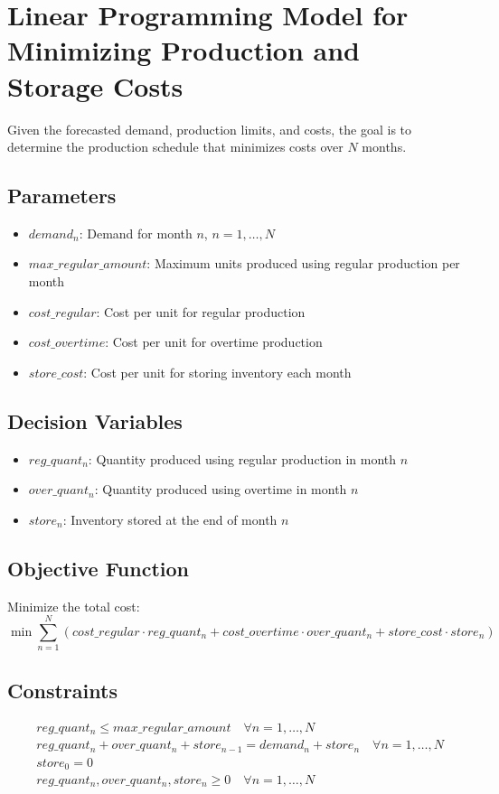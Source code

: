 \documentclass{article}
\begin{document}
\section*{Linear Programming Model for Minimizing Production and Storage Costs}

Given the forecasted demand, production limits, and costs, the goal is to determine the production schedule that minimizes costs over \(N\) months.

\subsection*{Parameters}
\begin{itemize}
    \item \(demand_n\): Demand for month \(n\), \(n = 1, \ldots, N\)
    \item \(max\_regular\_amount\): Maximum units produced using regular production per month
    \item \(cost\_regular\): Cost per unit for regular production
    \item \(cost\_overtime\): Cost per unit for overtime production
    \item \(store\_cost\): Cost per unit for storing inventory each month
\end{itemize}

\subsection*{Decision Variables}
\begin{itemize}
    \item \(reg\_quant_n\): Quantity produced using regular production in month \(n\)
    \item \(over\_quant_n\): Quantity produced using overtime in month \(n\)
    \item \(store_n\): Inventory stored at the end of month \(n\)
\end{itemize}

\subsection*{Objective Function}
Minimize the total cost:
\[
\min \sum_{n=1}^{N} \left( cost\_regular \cdot reg\_quant_n + cost\_overtime \cdot over\_quant_n + store\_cost \cdot store_n \right)
\]

\subsection*{Constraints}
\begin{align}
    & reg\_quant_n \leq max\_regular\_amount \quad \forall n = 1, \ldots, N \\
    & reg\_quant_n + over\_quant_n + store_{n-1} = demand_n + store_n \quad \forall n = 1, \ldots, N \\
    & store_0 = 0 \\
    & reg\_quant_n, over\_quant_n, store_n \geq 0 \quad \forall n = 1, \ldots, N
\end{align}
\end{document}
